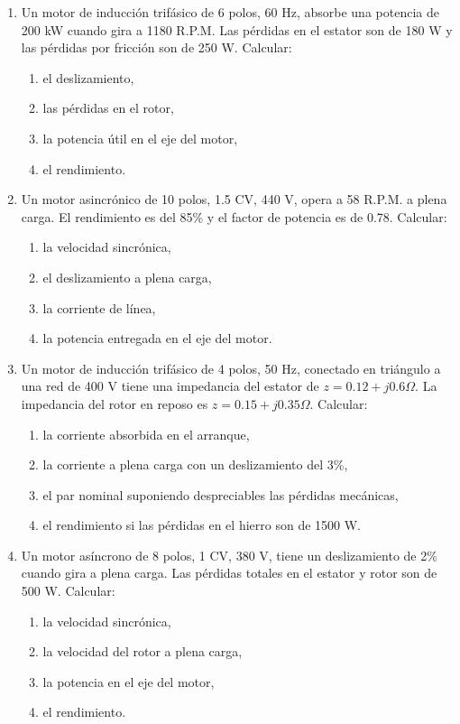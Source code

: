 \documentclass[../main]{subfiles}
\begin{document}
\newpage
{}
\begin{enumerate}
\pagestyle{empty}
\setcounter{enumi}{3} 
    \item Un motor de inducción trifásico de 6 polos, 60 Hz, absorbe una potencia de 200 kW cuando gira a 1180 R.P.M. Las pérdidas en el estator son de 180 W y las pérdidas por fricción son de 250 W. Calcular:
    \begin{enumerate}
        \item el deslizamiento,
        \item las pérdidas en el rotor,
        \item la potencia útil en el eje del motor,
        \item el rendimiento.
    \end{enumerate}
    
    \item Un motor asincrónico de 10 polos, 1.5 CV, 440 V, opera a 58 R.P.M. a plena carga. El rendimiento es del 85\% y el factor de potencia es de 0.78. Calcular:
    \begin{enumerate}
        \item la velocidad sincrónica,
        \item el deslizamiento a plena carga,
        \item la corriente de línea,
        \item la potencia entregada en el eje del motor.
    \end{enumerate}

    \item Un motor de inducción trifásico de 4 polos, 50 Hz, conectado en triángulo a una red de 400 V tiene una impedancia del estator de $z = 0.12 + j0.6 \Omega$. La impedancia del rotor en reposo es $z = 0.15 + j0.35 \Omega$. Calcular:
    \begin{enumerate}
        \item la corriente absorbida en el arranque,
        \item la corriente a plena carga con un deslizamiento del 3\%,
        \item el par nominal suponiendo despreciables las pérdidas mecánicas,
        \item el rendimiento si las pérdidas en el hierro son de 1500 W.
    \end{enumerate}
    
    \item Un motor asíncrono de 8 polos, 1 CV, 380 V, tiene un deslizamiento de 2\% cuando gira a plena carga. Las pérdidas totales en el estator y rotor son de 500 W. Calcular:
    \begin{enumerate}
        \item la velocidad sincrónica,
        \item la velocidad del rotor a plena carga,
        \item la potencia en el eje del motor,
        \item el rendimiento.
    \end{enumerate}
    

\end{enumerate}
\end{document}
